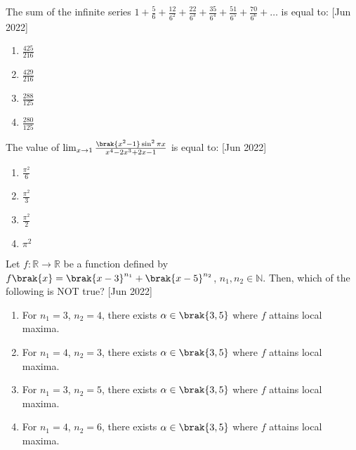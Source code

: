 	\item The sum of the infinite series $1+\frac{5}{6}+\frac{12}{6^2}+\frac{22}{6^3}+\frac{35}{6^4}+\frac{51}{6^5}+\frac{70}{6^6}+\dots$ is equal to: \hfill{[Jun 2022]}
		\begin{enumerate}
		\item $\frac{425}{216}$\\
		\item $\frac{429}{216}$\\
		\item $\frac{288}{125}$\\
		\item $\frac{280}{125}$\\
		\end{enumerate}
	\item The value of $\lim_{x\to 1}\frac{\brak{x^2-1}\sin^2{\pi x}}{x^4-2x^3+2x-1}$ is equal to: \hfill{[Jun 2022]}
		\begin{enumerate}
			\item $\frac{{\pi}^2}{6}$\\
                        \item $\frac{{\pi}^2}{3}$\\
                        \item $\frac{{\pi}^2}{2}$\\
                        \item ${\pi}^2$\\
		\end{enumerate}
	\item Let $f:\mathbb{R}\to \mathbb{R}$ be a function defined by $f\brak{x}={\brak{x-3}}^{n_1}+{\brak{x-5}}^{n_2}$, $n_1,n_2\in \mathbb{N}$. Then, which of the following is NOT true? \hfill{[Jun 2022]}
		\begin{enumerate}
			\item For $n_1=3$, $n_2=4$, there exists $\alpha\in\brak{3,5}$ where $f$ attains local maxima.\\
                        \item For $n_1=4$, $n_2=3$, there exists $\alpha\in\brak{3,5}$ where $f$ attains local maxima.\\
                        \item For $n_1=3$, $n_2=5$, there exists $\alpha\in\brak{3,5}$ where $f$ attains local maxima.\\
                        \item For $n_1=4$, $n_2=6$, there exists $\alpha\in\brak{3,5}$ where $f$ attains local maxima.\\
		\end{enumerate}
